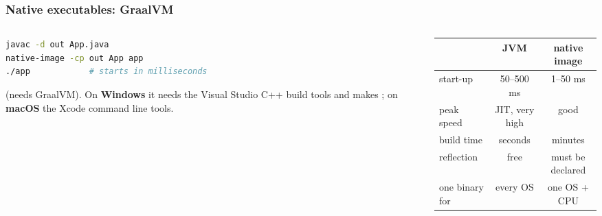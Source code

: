 \documentclass[aspectratio=169,10pt,compress]{beamer}
\newcommand{\win}{\textbf{Windows}}
\newcommand{\mac}{\textbf{macOS}}
\begin{document}
\begin{frame}[t,fragile] \frametitle{Native executables: GraalVM }
  \begin{columns}[T]
    \begin{column}{0.48\textwidth}


\begin{lstlisting}[style=codesnippet, language=bash, basicstyle=\ttfamily\scriptsize]
javac -d out App.java
native-image -cp out App app
./app            # starts in milliseconds
\end{lstlisting}


      \small {} (needs GraalVM). On \win{} it needs the Visual Studio C++ build tools and makes ;
      on \mac{} the Xcode command line tools.
    \end{column}
    \begin{column}{0.48\textwidth}
      \begin{center}\scriptsize
      \begin{tabular}{lcc}
        \toprule
                          & JVM               & native image \\
        \midrule
        start-up          & 50--500 ms        & 1--50 ms \\
        peak speed        & JIT, very high    & good \\
        build time        & seconds           & minutes \\
        reflection        & free              & must be declared \\
        one binary for    & every OS          & one OS + CPU \\
        \bottomrule
      \end{tabular}
      \end{center}
    \end{column}
  \end{columns}
\end{frame}

\end{document}
